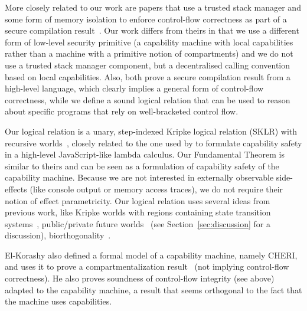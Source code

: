 \documentclass[compsoc,conference,letterpaper,fleqn]{IEEEtran}
\begin{document}
More closely related to our work are papers that use a trusted stack manager and
some form of memory isolation to enforce control-flow correctness as part of a
secure compilation
result~\citep{patrignani_modular_2016-1,juglaret_beyond_2016-1}. Our work
differs from theirs in that we use a different form of low-level security
primitive (a capability machine with local capabilities rather than a machine
with a primitive notion of compartments) and we do not use a trusted stack
manager component, but a decentralised calling convention based on local
capabilities. Also, both prove a secure compilation result from a high-level
language, which clearly implies a general form of control-flow correctness,
while we define a sound logical relation that can be used to reason about
specific programs that rely on well-bracketed control flow.

Our logical relation is a unary, step-indexed Kripke logical relation (SKLR)
with recursive
worlds~\cite{Appel:2001:IMR:504709.504712,Ahmed2004semantics,Birkedal:2011:SKM:1926385.1926401},
closely related to the one used by \citet{Devriese:2016ObjCap} to formulate
capability safety in a high-level JavaScript-like lambda calculus. Our
Fundamental Theorem is similar to theirs and can be seen as a formulation of
capability safety of the capability machine. Because we are not interested in
externally observable side-effects (like console output or memory access
traces), we do not require their notion of effect parametricity. Our logical
relation uses several ideas from previous work, like Kripke worlds with regions
containing state transition systems~\citep{Ahmed:popl09}, public/private future
worlds~\citep{Dreyer:jfp12} (see Section~\ref{sec:discussion} for a discussion),
biorthogonality~\citep{pitts_operational_1998,benton_biorthogonality_2009-1,Hur:2011:KLR:1926385.1926402}.

El-Korashy also defined a formal model of a capability machine, namely CHERI,
and uses it to prove a compartmentalization
result~\citep{akram_el-korashy_formal_2016} (not implying control-flow
correctness). He also proves soundness of control-flow integrity (see above)
adapted to the capability machine, a result that seems orthogonal to the fact
that the machine uses capabilities.

\end{document}
